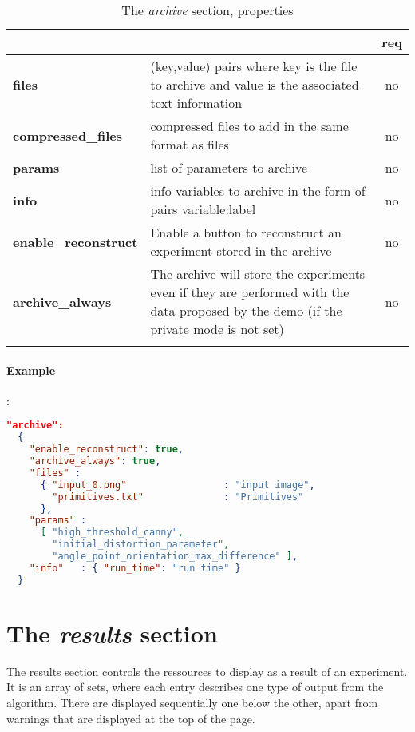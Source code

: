 \begin{longtable}{|>{\bf}L{\linewidth}|L{\linewidth}|c|}
\hline
{}     &  & {\bf req} \tabularnewline 
\hline \hline
 files    & (key,value) pairs where key is the file to archive and value is 
            the associated text information & no \\ \hline
 compressed\_\-files   & compressed files to add in the same format 
as files & no \\ \hline
 params  & list of parameters to archive & no \\ \hline
 info    & info variables to archive in the form of pairs variable:label & no \\ \hline
 enable\_reconstruct & Enable a button to reconstruct an experiment stored in the archive & no \\ \hline
 archive\_always     & The archive will store the experiments even if they are performed with the data proposed by the demo (if the private mode is not set) & no \\ \hline
\caption{The \emph{archive} section, properties}
\end{longtable}


\paragraph{Example}:\\
\begin{lstlisting}[language=json,firstnumber=1]
"archive":
  {
    "enable_reconstruct": true,
    "archive_always": true,
    "files" : 
      { "input_0.png"                 : "input image",
        "primitives.txt"              : "Primitives"
      },
    "params" :  
      [ "high_threshold_canny", 
        "initial_distortion_parameter", 
        "angle_point_orientation_max_difference" ],
    "info"   : { "run_time": "run time" }
  }
\end{lstlisting}

\section{The \emph{results} section}


The results section controls the ressources to display as a result of an experiment.
It is an array of sets, where each entry describes one type of output from the algorithm.
There are 
displayed sequentially one below the other, apart from warnings that are 
displayed at the top of the page.

